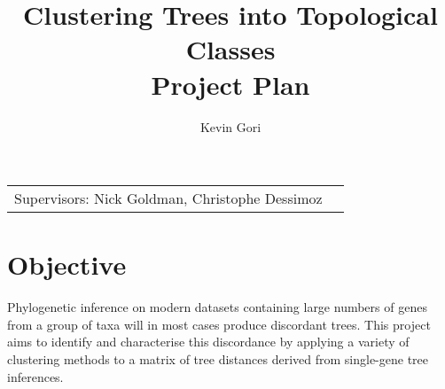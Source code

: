 \documentclass[10pt]{article}
\title{\textbf{Clustering Trees into Topological Classes \\ Project Plan}} %
\author{Kevin Gori} %
\begin{document}
\maketitle %

\begin{tabular}{lr}

Supervisors: Nick Goldman, Christophe Dessimoz %
\end{tabular}

\setlength\parindent{0pt} %



\section{Objective}
Phylogenetic inference on modern datasets containing large numbers of genes from a group of taxa will in most cases produce discordant trees. 
This project aims to identify and characterise this discordance by applying a variety of clustering methods to a matrix of tree distances derived from single-gene tree inferences.


\end{document}
